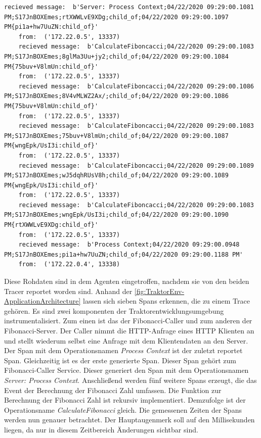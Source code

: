 \begin{minipage}[]{\textwidth}
	\begin{lstlisting}[frame=trBL]
	recieved message:  b'Server: Process Context;04/22/2020 09:29:00.1081 PM;S17JnBOXEmes;rtXWWLvE9XDg;child_of;04/22/2020 09:29:00.1097 PM{pi1a+hw7UuZN:child_of}'
	from:  ('172.22.0.5', 13337)
	recieved message:  b'CalculateFiboncacci;04/22/2020 09:29:00.1083 PM;S17JnBOXEmes;8glMa3Uu+jy2;child_of;04/22/2020 09:29:00.1084 PM{75buv+V8lmUn:child_of}'
	from:  ('172.22.0.5', 13337)
	recieved message:  b'CalculateFiboncacci;04/22/2020 09:29:00.1086 PM;S17JnBOXEmes;8V4vMLWZ2Ax/;child_of;04/22/2020 09:29:00.1086 PM{75buv+V8lmUn:child_of}'
	from:  ('172.22.0.5', 13337)
	recieved message:  b'CalculateFiboncacci;04/22/2020 09:29:00.1083 PM;S17JnBOXEmes;75buv+V8lmUn;child_of;04/22/2020 09:29:00.1087 PM{wngEpk/UsI3i:child_of}'
	from:  ('172.22.0.5', 13337)
	recieved message:  b'CalculateFiboncacci;04/22/2020 09:29:00.1089 PM;S17JnBOXEmes;wJ5dqhRUsV8h;child_of;04/22/2020 09:29:00.1089 PM{wngEpk/UsI3i:child_of}'
	from:  ('172.22.0.5', 13337)
	recieved message:  b'CalculateFiboncacci;04/22/2020 09:29:00.1083 PM;S17JnBOXEmes;wngEpk/UsI3i;child_of;04/22/2020 09:29:00.1090 PM{rtXWWLvE9XDg:child_of}'
	from:  ('172.22.0.5', 13337)
	recieved message:  b'Process Context;04/22/2020 09:29:00.0948 PM;S17JnBOXEmes;pi1a+hw7UuZN;child_of;04/22/2020 09:29:00.1188 PM'
	from:  ('172.22.0.4', 13338)
	\end{lstlisting}
	\label{listing:Tracerrohdaten aus der Traktorentwicklungsumgebung}
\end{minipage}

Diese Rohdaten sind in dem Agenten eingetroffen, nachdem sie von den beiden Tracer reportet worden sind. Anhand der \cref{fig:TraktorEnv-ApplicationArchitecture} lassen sich sieben Spans erkennen, die zu einem Trace gehören. Es sind zwei komponenten der Traktorentwicklungsumgebung instrumentalisiert. Zum einen ist das der Fibonacci-Caller und zum anderen der Fibonacci-Server. Der Caller nimmt die HTTP-Anfrage eines HTTP Klienten an und stellt wiederum selbst eine Anfrage mit dem Klientendaten an den Server. Der Span mit dem Operationsnamen \emph{Process Context} ist der zuletzt reportet Span. Gleichzeitig ist es der erste generierte Span. Dieser Span gehört zum Fibonacci-Caller Service. Dieser generiert den Span mit dem Operationsnamen \emph{Server: Process Context}. Anschließend werden fünf weitere Spans erzeugt, die das Event der Berechnung der Fibonacci Zahl umfassen. Die Funktion zur Berechnung der Fibonacci Zahl ist rekursiv implementiert. Demzufolge ist der Operationsname \emph{CalculateFibonacci} gleich. Die gemessenen Zeiten der Spans werden nun genauer betrachtet. Der Hauptaugenmerk soll auf den Millisekunden liegen, da nur in diesem Zeitbereich Änderungen sichtbar sind.


